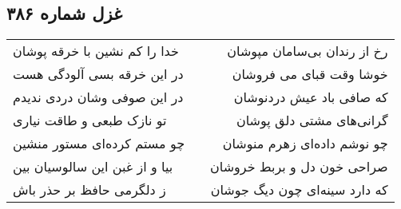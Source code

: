 \begin{center}
\section*{غزل شماره ۳۸۶}
\label{sec:sh386}
\begin{longtable}{l p{0.5cm} r}
خدا را کم نشین با خرقه پوشان
&&
رخ از رندان بی‌سامان مپوشان
\\
در این خرقه بسی آلودگی هست
&&
خوشا وقت قبای می فروشان
\\
در این صوفی وشان دردی ندیدم
&&
که صافی باد عیش دردنوشان
\\
تو نازک طبعی و طاقت نیاری
&&
گرانی‌های مشتی دلق پوشان
\\
چو مستم کرده‌ای مستور منشین
&&
چو نوشم داده‌ای زهرم منوشان
\\
بیا و از غبن این سالوسیان بین
&&
صراحی خون دل و بربط خروشان
\\
ز دلگرمی حافظ بر حذر باش
&&
که دارد سینه‌ای چون دیگ جوشان
\\
\end{longtable}
\end{center}
